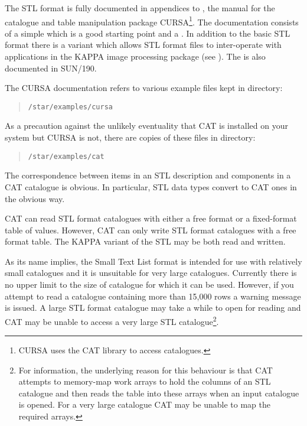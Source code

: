 The STL format is fully documented in appendices to
\cite{SUN190}, the manual for the catalogue and
table manipulation package CURSA\footnote{CURSA uses the CAT library to
access catalogues.}.  The documentation consists of a simple
 which is a good starting point and a
.  In addition to the basic STL
format there is a variant which allows STL format files to inter-operate
with applications in the KAPPA image processing package (see
\cite{SUN190}).  The
 is also documented in SUN/190.

The CURSA documentation refers to various example files kept in
directory:

\begin{verse}
{\tt /star/examples/cursa}
\end{verse}

As a precaution against the unlikely eventuality that CAT is installed
on your system but CURSA is not, there are copies of these files in
directory:

\begin{verse}
{\tt /star/examples/cat}
\end{verse}

The correspondence between items in an STL description and components
in a CAT catalogue is obvious.  In particular, STL data types convert
to CAT ones in the obvious way.

CAT can read STL format catalogues with either a free format or a
fixed-format table of values.  However, CAT can only write STL format
catalogues with a free format table.  The KAPPA variant of the STL may be
both read and written.

As its name implies, the Small Text List format is intended for use
with relatively small catalogues and it is unsuitable for very large
catalogues.  Currently there is no upper limit to the size of catalogue
for which it can be used.  However, if you attempt to read a catalogue
containing more than 15,000 rows a warning message is issued.  A large STL
format catalogue may take a while to open for reading and CAT may be
unable to access a very large STL catalogue\footnote{For
information, the underlying reason for this behaviour is that CAT
attempts to memory-map work arrays to hold the columns of an STL
catalogue and then reads the table into these arrays when an input
catalogue is opened.  For a very large catalogue CAT may be unable to
map the required arrays.}.

